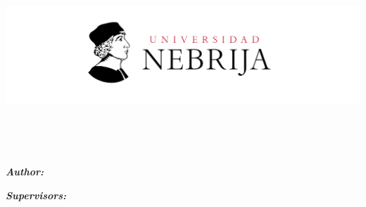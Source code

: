 \documentclass[
11pt, %
english, %
singlespacing, %
headsepline, %
]{MastersDoctoralThesis} %
\author{Sergio López Baños \orcidlink{0009-0001-4873-7437}} %
\begin{document}
\frontmatter %
\pagestyle{plain} %


\begin{titlepage}
\pagecolor{RojoNebrija}
\color{white}
\begin{center}


\centerline{\includegraphics[width=220mm]{logos/LogoPortada.png}}

\HRule \\[0.4cm] %
{\huge \bfseries \ttitle\par}\vspace{0.4cm} %
\HRule \\[1.5cm] %
 
\begin{minipage}[t]{0.4\textwidth}
\begin{flushleft} \large
\emph{\textbf{Author:}}\\
\item {\authorname} %
\end{flushleft}
\end{minipage}
\begin{minipage}[t]{0.4\textwidth}
\begin{flushright} \large
\emph{\textbf{Supervisors:}} \\
{\supname} %
\end{flushright}
\end{minipage}\\[3cm]
 

\end{center}
\end{titlepage}
\end{document}
